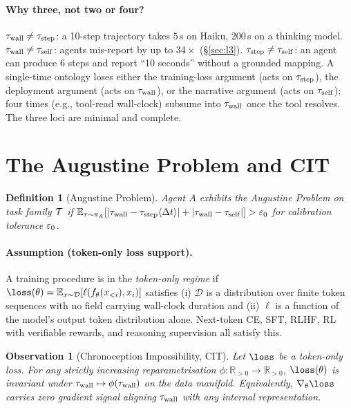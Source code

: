 \documentclass{article}
\newtheorem{observation}{Observation}
\newtheorem{definition}{Definition}
\begin{document}
\paragraph{Why three, not two or four?} $\tau_{\mathrm{wall}} \neq \tau_{\mathrm{step}}$: a 10-step trajectory takes $5$\,s on Haiku, $200$\,s on a thinking model. $\tau_{\mathrm{wall}} \neq \tau_{\mathrm{self}}$: agents mis-report by up to $34\times$ (\S\ref{sec:l3}). $\tau_{\mathrm{step}} \neq \tau_{\mathrm{self}}$: an agent can produce 6 steps and report ``10 seconds'' without a grounded mapping. A single-time ontology loses either the training-loss argument (acts on $\tau_{\mathrm{step}}$), the deployment argument (acts on $\tau_{\mathrm{wall}}$), or the narrative argument (acts on $\tau_{\mathrm{self}}$); four times (e.g., tool-read wall-clock) subsume into $\tau_{\mathrm{wall}}$ once the tool resolves. The three loci are minimal and complete.

\section{The Augustine Problem and CIT}\label{sec:cit}

\begin{definition}[Augustine Problem]\label{def:aug}
Agent $A$ exhibits the Augustine Problem on task family $\mathcal{T}$ if $\mathbb{E}_{\tau \sim \pi_A}\!\left[|\tau_{\mathrm{wall}} - \tau_{\mathrm{step}}\langle\Delta t\rangle| + |\tau_{\mathrm{wall}} - \tau_{\mathrm{self}}|\right] > \varepsilon_0$ for calibration tolerance $\varepsilon_0$.
\end{definition}

\paragraph{Assumption (token-only loss support).}\label{ass:token}
A training procedure is in the \emph{token-only regime} if $\loss(\theta) = \mathbb{E}_{x \sim \mathcal{D}}[\ell(f_\theta(x_{<i}), x_i)]$ satisfies (i) $\mathcal{D}$ is a distribution over finite token sequences with no field carrying wall-clock duration and (ii) $\ell$ is a function of the model's output token distribution alone. Next-token CE, SFT, RLHF, RL with verifiable rewards, and reasoning supervision all satisfy this.

\begin{observation}[Chronoception Impossibility, CIT]\label{thm:cit}
Let $\loss$ be a token-only loss. For any strictly increasing reparametrisation $\phi:\mathbb{R}_{>0}\!\to\!\mathbb{R}_{>0}$, $\loss(\theta)$ is invariant under $\tau_{\mathrm{wall}} \mapsto \phi(\tau_{\mathrm{wall}})$ on the data manifold. Equivalently, $\nabla_\theta\loss$ carries zero gradient signal aligning $\tau_{\mathrm{wall}}$ with any internal representation.
\end{observation}
\end{document}
